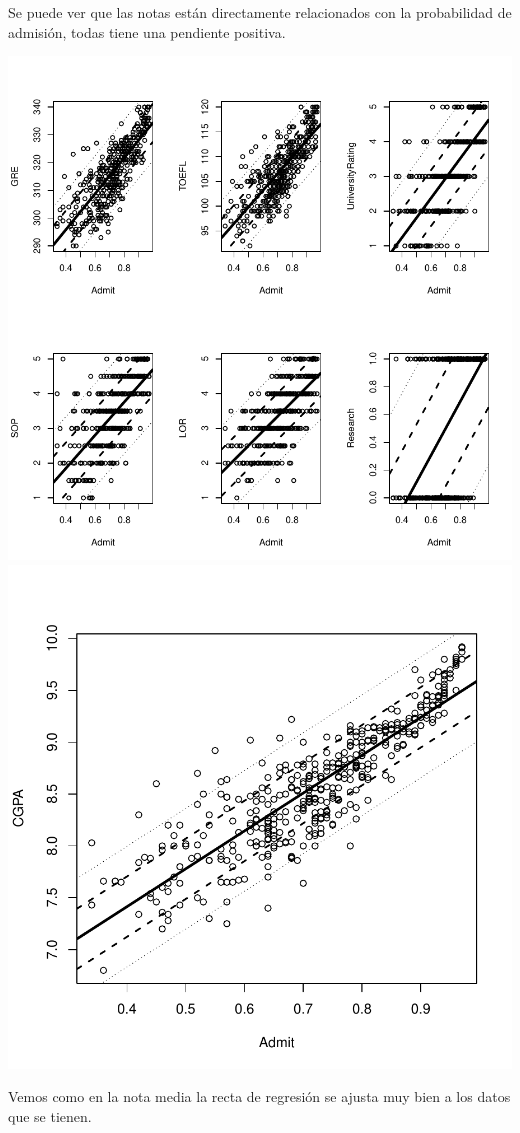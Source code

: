 \documentclass [a4paper] {article}
\begin{document}
Se puede ver que las notas están directamente relacionados con la probabilidad de admisión, todas tiene una pendiente positiva.
\begin{center}
\includegraphics{entrega-analisis_grades_plot_1}
\includegraphics{entrega-analisis_grades_plot_2}
\end{center}
Vemos como en la nota media la recta de regresión se ajusta muy bien a los datos que se tienen.
\end{document}
